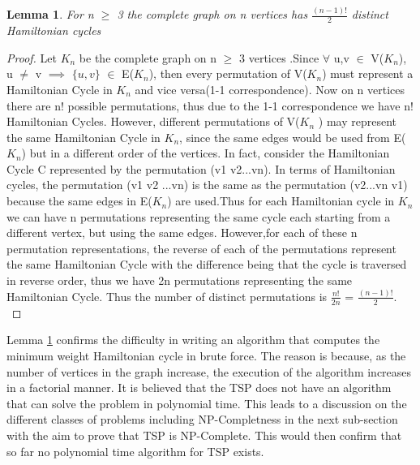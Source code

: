 \documentclass{article}
\newtheorem{lemma}[definition]{Lemma}
\begin{document}
\begin{lemma}
\label{running_time}
For n $\geq$ 3 the complete graph on n vertices has $\frac{(n-1)!}{2}$ distinct Hamiltonian cycles
\end{lemma}
\begin{proof}
Let $K_n$ be the complete graph on n $\geq$ 3 vertices .Since $\forall$ u,v $\in$ V($K_n$), u $\ne$ v $\implies$ $\{u,v\}$ $\in$ E($K_n$), then every permutation of V($K_n$) must represent a Hamiltonian Cycle in $K_n$ and vice versa(1-1 correspondence). Now on n vertices there are n! possible permutations, thus due to the 1-1 correspondence we have n! Hamiltonian Cycles. However, different permutations of V($K_n$ ) may represent the same Hamiltonian Cycle in $K_n$, since the same edges would be used from E($K_n$) but in a different order of the vertices. In fact, consider the Hamiltonian Cycle C represented by the permutation (v1 v2...vn). In terms of Hamiltonian cycles, the permutation (v1 v2 ...vn) is the same as the permutation (v2...vn v1) because the same edges in E($K_n$) are used.Thus for each Hamiltonian cycle in $K_n$ we can have n permutations representing the same cycle each starting from a different vertex, but using the same edges. However,for each of these n permutation representations, the reverse of each of the permutations represent the same Hamiltonian Cycle with the difference being that the cycle is traversed in reverse order, thus we have 2n permutations representing the same Hamiltonian Cycle. Thus the number of distinct permutations is $\frac{n!}{2n}$ = $\frac{(n-1)!}{2}$. \cite{mathematics_stack_exchange_2012}
\end{proof}
Lemma \ref{running_time} confirms the difficulty in writing an algorithm that computes the minimum weight Hamiltonian cycle in brute force. The reason is because, as the number of vertices in the graph increase, the execution of the algorithm increases in a factorial manner. It is believed that the TSP does not have an algorithm that can solve the problem in polynomial time. This leads to a discussion on the different classes of problems including NP-Completness in the next sub-section with the aim to prove that TSP is NP-Complete. This would then confirm that so far no polynomial time algorithm for TSP exists.
\end{document}
